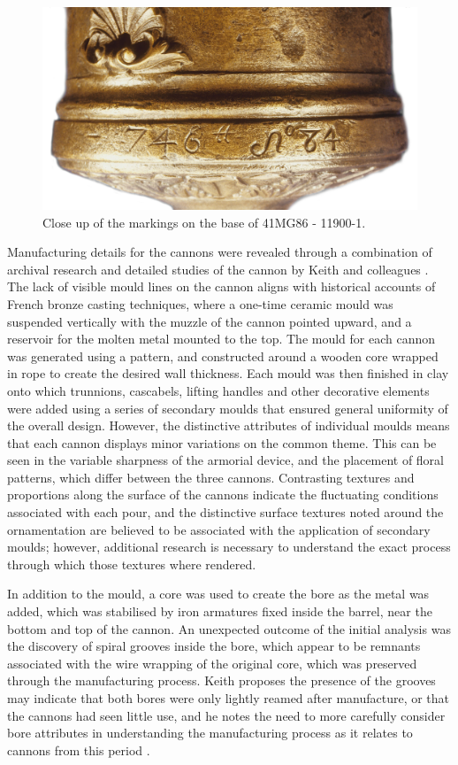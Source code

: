 \documentclass[review]{elsarticle}
\begin{document}
\begin{figure}[ht]\centering
\includegraphics[width=\linewidth]{FigBASE2}
\caption{Close up of the markings on the base of 41MG86 - 11900-1.}
\label{fig:FigBASE}
\end{figure}

Manufacturing details for the cannons were revealed through a combination of archival research and detailed studies of the cannon by Keith and colleagues \citep[359-367]{RN5763}. The lack of visible mould lines on the cannon aligns with historical accounts of French bronze casting techniques, where a one-time ceramic mould was suspended vertically with the muzzle of the cannon pointed upward, and a reservoir for the molten metal mounted to the top. The mould for each cannon was generated using a pattern, and constructed around a wooden core wrapped in rope to create the desired wall thickness. Each mould was then finished in clay onto which trunnions, cascabels, lifting handles and other decorative elements were added using a series of secondary moulds that ensured general uniformity of the overall design. However, the distinctive attributes of individual moulds means that each cannon displays minor variations on the common theme. This can be seen in the variable sharpness of the armorial device, and the placement of floral patterns, which differ between the three cannons. Contrasting textures and proportions along the surface of the cannons indicate the fluctuating conditions associated with each pour, and the distinctive surface textures noted around the ornamentation are believed to be associated with the application of secondary moulds; however, additional research is necessary to understand the exact process through which those textures where rendered.

In addition to the mould, a core was used to create the bore as the metal was added, which was stabilised by iron armatures fixed inside the barrel, near the bottom and top of the cannon. An unexpected outcome of the initial analysis was the discovery of spiral grooves inside the bore, which appear to be remnants associated with the wire wrapping of the original core, which was preserved through the manufacturing process. Keith proposes the presence of the grooves may indicate that both bores were only lightly reamed after manufacture, or that the cannons had seen little use, and he notes the need to more carefully consider bore attributes in understanding the manufacturing process as it relates to cannons from this period \citep[366]{RN5763}.
\end{document}
